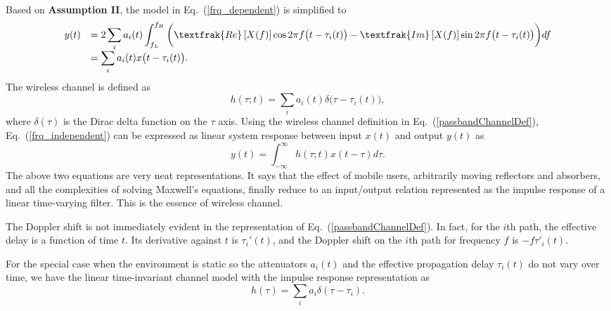 \documentclass[letterpaper,11pt]{article}
\begin{document}

~~\\

Based on {\textbf{Assumption II}}, the model in Eq.~(\ref{frq_dependent}) is simplified to
\begin{equation}\label{frq_independent}
\begin{array}{rl}
y(t)&=\displaystyle2\sum_ia_i(t)\int_{f_L}^{f_H}\bigg({\textfrak{Re}}\left[X(f)\right]\cos2\pi f\big(t-\tau_i(t)\big)-{\textfrak{Im}}\left[X(f)\right]\sin2\pi f\big(t-\tau_i(t)\big)\bigg)df\\
&=\displaystyle\sum_i a_i(t)x\big(t-\tau_i(t)\big).\\
\end{array}
\end{equation}
The wireless channel is defined as
\begin{equation}\label{passbandChannelDef}
\boxed{h(\tau;t)=\displaystyle\sum_ia_i(t)\delta\bigg(\tau-\tau_i(t)\bigg),}
\end{equation}
where $\delta(\tau)$ is the Dirac delta function on the $\tau$ axis. Using the wireless channel definition in Eq.~{(\ref{passbandChannelDef}}), Eq.~(\ref{frq_independent}) can be expressed as linear system response between input $x(t)$ and output $y(t)$ as
\begin{equation}
y(t)=\displaystyle\int_{-\infty}^{\infty}h(\tau;t)x(t-\tau)d\tau.
\end{equation}
The above two equations are very neat representations. It says that the effect of mobile users, arbitrarily moving reflectors and absorbers, and all the complexities of solving Maxwell's equations, finally reduce to an input/output relation represented as the impulse response of a linear time-varying filter. This is the essence of wireless channel.

The Doppler shift is not immediately evident in the representation of Eq.~(\ref{passbandChannelDef}). In fact, for the $i$th path, the effective delay is a function of time $t$. Its derivative against $t$ is $\tau_i'(t)$, and the Doppler shift on the $i$th path for frequency $f$ is $-f\tau'_i(t)$. 

For the special case when the environment is static so the attenuators $a_i(t)$ and the effective propagation delay $\tau_i(t)$ do not vary over time, we have the linear time-invariant channel model with the impulse response representation as
\begin{equation}
h(\tau)=\displaystyle\sum_ia_i\delta(\tau-\tau_i).
\end{equation}
\end{document}
